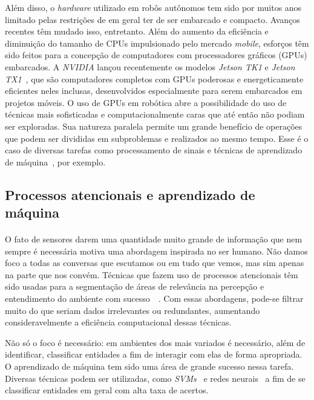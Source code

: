 \documentclass[8pt]{article}
\newcommand{\tit}[1]{\textit{#1}}
\begin{document}
\begin{multicols}{2}
Além disso, o \tit{hardware} utilizado em robôs autônomos tem sido por muitos 
anos limitado pelas restrições de em geral ter de ser embarcado e compacto.
Avanços recentes têm mudado isso, entretanto. 
Além do aumento da eficiência e diminuição do tamanho de CPUs impulsionado
pelo mercado \tit{mobile}, esforços têm sido feitos para a concepção de 
computadores com processadores gráficos (GPUs) embarcados. 
A \tit{NVIDIA} lançou recentemente os modelos 
\tit{Jetson TK1} e \tit{Jetson TX1}~\cite{jetson}, que são computadores 
completos com GPUs poderosas e energeticamente eficientes neles inclusas, 
desenvolvidos especialmente para serem embarcados em projetos móveis.
O uso de GPUs em robótica abre a possibilidade do uso de técnicas mais 
sofisticadas e computacionalmente caras que até então não podiam ser exploradas.
Sua natureza paralela permite um grande benefício de operações que podem ser
divididas em subproblemas e realizados ao mesmo tempo. 
Esse é o caso de diversas tarefas como processamento de sinais e técnicas 
de aprendizado de máquina~\cite{gpu}, por exemplo. 

\subsection{Processos atencionais e aprendizado de máquina}
\paragraph{}
O fato de sensores darem uma quantidade muito grande de informação que nem 
sempre é necessária motiva uma abordagem inspirada no ser humano.
Não damos foco a todas as conversas que escutamos ou em tudo que vemos, mas sim 
apenas na parte que nos convém. 
Técnicas que fazem uso de processos atencionais têm sido usadas para a 
segmentação de áreas de relevância na percepção e entendimento do 
ambiente com sucesso~\cite{bio}~\cite{esther}.
Com essas abordagens, pode-se filtrar muito do que seriam dados irrelevantes ou
redundantes, aumentando consideravelmente a eficiência computacional dessas
técnicas.

Não só o foco é necessário: em ambientes dos mais variados é necessário, além
de identificar, classificar entidades a fim de interagir com elas de forma
apropriada. 
O aprendizado de máquina tem sido uma área de grande sucesso nessa tarefa.
Diversas técnicas podem ser utilizadas, como \tit{SVMs}~\cite{svm} 
e redes neurais~\cite{nn} a fim de se classificar entidades em geral com 
alta taxa de acertos. 


\end{multicols}
\end{document}
